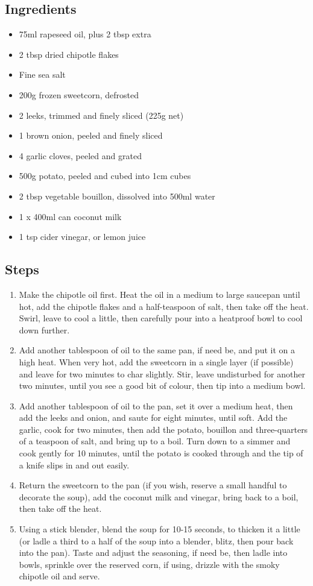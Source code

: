 \documentclass{book}
\begin{document}
\subsection*{Ingredients}
\begin{itemize}
\item 75ml rapeseed oil, plus 2 tbsp extra
\item 2 tbsp dried chipotle flakes
\item Fine sea salt
\item 200g frozen sweetcorn, defrosted
\item 2 leeks, trimmed and finely sliced (225g net)
\item 1 brown onion, peeled and finely sliced
\item 4 garlic cloves, peeled and grated
\item 500g potato, peeled and cubed into 1cm cubes
\item 2 tbsp vegetable bouillon, dissolved into 500ml water
\item 1 x 400ml can coconut milk
\item 1 tsp cider vinegar, or lemon juice
\end{itemize}

\subsection*{Steps}
\begin{enumerate}
\item Make the chipotle oil first. Heat the oil in a medium to large saucepan until hot, add the chipotle flakes and a half-teaspoon of salt, then take off the heat. Swirl, leave to cool a little, then carefully pour into a heatproof bowl to cool down further.
\item Add another tablespoon of oil to the same pan, if need be, and put it on a high heat. When very hot, add the sweetcorn in a single layer (if possible) and leave for two minutes to char slightly. Stir, leave undisturbed for another two minutes, until you see a good bit of colour, then tip into a medium bowl.
\item Add another tablespoon of oil to the pan, set it over a medium heat, then add the leeks and onion, and saute for eight minutes, until soft. Add the garlic, cook for two minutes, then add the potato, bouillon and three-quarters of a teaspoon of salt, and bring up to a boil. Turn down to a simmer and cook gently for 10 minutes, until the potato is cooked through and the tip of a knife slips in and out easily.
\item Return the sweetcorn to the pan (if you wish, reserve a small handful to decorate the soup), add the coconut milk and vinegar, bring back to a boil, then take off the heat.
\item Using a stick blender, blend the soup for 10-15 seconds, to thicken it a little (or ladle a third to a half of the soup into a blender, blitz, then pour back into the pan). Taste and adjust the seasoning, if need be, then ladle into bowls, sprinkle over the reserved corn, if using, drizzle with the smoky chipotle oil and serve.
\end{enumerate}
\newpage
\end{document}
